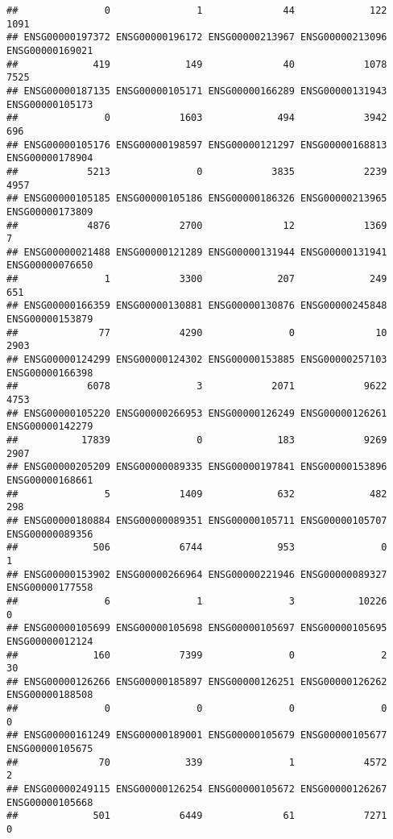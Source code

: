 \documentclass[
]{article}
\begin{document}
\begin{verbatim}
##               0               1              44             122            1091 
## ENSG00000197372 ENSG00000196172 ENSG00000213967 ENSG00000213096 ENSG00000169021 
##             419             149              40            1078            7525 
## ENSG00000187135 ENSG00000105171 ENSG00000166289 ENSG00000131943 ENSG00000105173 
##               0            1603             494            3942             696 
## ENSG00000105176 ENSG00000198597 ENSG00000121297 ENSG00000168813 ENSG00000178904 
##            5213               0            3835            2239            4957 
## ENSG00000105185 ENSG00000105186 ENSG00000186326 ENSG00000213965 ENSG00000173809 
##            4876            2700              12            1369               7 
## ENSG00000021488 ENSG00000121289 ENSG00000131944 ENSG00000131941 ENSG00000076650 
##               1            3300             207             249             651 
## ENSG00000166359 ENSG00000130881 ENSG00000130876 ENSG00000245848 ENSG00000153879 
##              77            4290               0              10            2903 
## ENSG00000124299 ENSG00000124302 ENSG00000153885 ENSG00000257103 ENSG00000166398 
##            6078               3            2071            9622            4753 
## ENSG00000105220 ENSG00000266953 ENSG00000126249 ENSG00000126261 ENSG00000142279 
##           17839               0             183            9269            2907 
## ENSG00000205209 ENSG00000089335 ENSG00000197841 ENSG00000153896 ENSG00000168661 
##               5            1409             632             482             298 
## ENSG00000180884 ENSG00000089351 ENSG00000105711 ENSG00000105707 ENSG00000089356 
##             506            6744             953               0               1 
## ENSG00000153902 ENSG00000266964 ENSG00000221946 ENSG00000089327 ENSG00000177558 
##               6               1               3           10226               0 
## ENSG00000105699 ENSG00000105698 ENSG00000105697 ENSG00000105695 ENSG00000012124 
##             160            7399               0               2              30 
## ENSG00000126266 ENSG00000185897 ENSG00000126251 ENSG00000126262 ENSG00000188508 
##               0               0               0               0               0 
## ENSG00000161249 ENSG00000189001 ENSG00000105679 ENSG00000105677 ENSG00000105675 
##              70             339               1            4572               2 
## ENSG00000249115 ENSG00000126254 ENSG00000105672 ENSG00000126267 ENSG00000105668 
##             501            6449              61            7271               0 

\end{verbatim}
\end{document}
